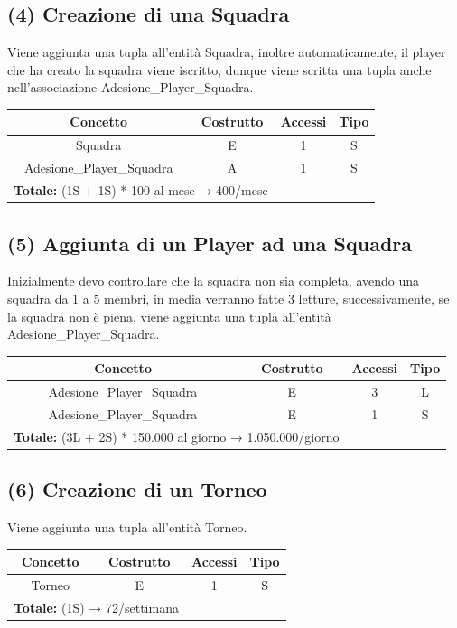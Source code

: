 \documentclass[a4paper,12pt]{report}
\begin{document}
\subsection*{(4) Creazione di una Squadra}
Viene aggiunta una tupla all'entità Squadra, inoltre automaticamente, il player che ha creato la squadra viene iscritto, dunque viene scritta una tupla anche nell'associazione Adesione\_Player\_Squadra.
\begin{center}
	\begin{tabular}{|c|c|c|c|}
		\hline\rowcolor{pink}
		Concetto & Costrutto & Accessi & Tipo\\
		\hline
		Squadra & E & 1 & S\\
		\hline
		Adesione\_Player\_Squadra & A & 1 & S\\
		\hline\hline
		\multicolumn{2}{l}{%
			\textbf{Totale:} (1S + 1S) * 100 al mese  → 400/mese} \\
		\hline\hline
	\end{tabular}
\end{center}
\subsection*{(5) Aggiunta di un Player ad una Squadra}
Inizialmente devo controllare che la squadra non sia completa, avendo una squadra da 1 a 5 membri, in media verranno fatte 3 letture, successivamente, se la squadra non è piena, viene aggiunta una tupla all'entità Adesione\_Player\_Squadra.
\begin{center}
	\begin{tabular}{|c|c|c|c|}
		\hline\rowcolor{pink}
		Concetto & Costrutto & Accessi & Tipo\\
		\hline\hline		
		Adesione\_Player\_Squadra & E & 3 & L\\
		Adesione\_Player\_Squadra & E & 1 & S\\
		\hline
		\hline
		\multicolumn{2}{l}{%
			\textbf{Totale:} (3L + 2S) * 150.000 al giorno → 1.050.000/giorno} \\
		\hline
	\end{tabular}
\end{center}
\subsection*{(6) Creazione di un Torneo}
Viene aggiunta una tupla all'entità Torneo.
\begin{center}
	\begin{tabular}{|c|c|c|c|}
		\hline\rowcolor{pink}
		Concetto & Costrutto & Accessi & Tipo\\
		\hline\hline		
		Torneo & E & 1 & S\\
		\hline
		\hline
		\multicolumn{2}{l}{%
			\textbf{Totale:} (1S) → 72/settimana} \\
		\hline
	\end{tabular}
\end{center}
\end{document}
